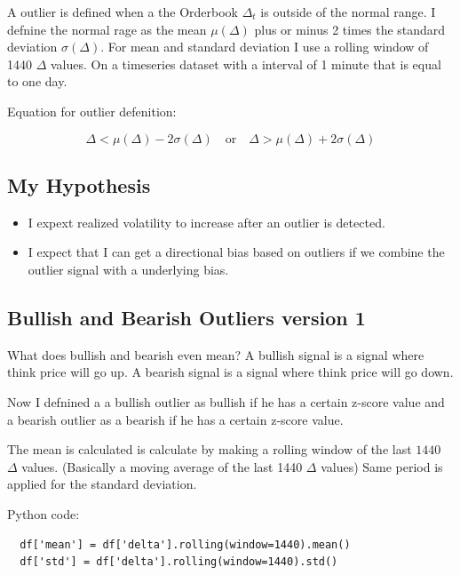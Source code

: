 \documentclass[12pt]{article}
\begin{document}
A outlier is defined when a the Orderbook $\Delta_t$ is outside of the normal range. I defnine the normal rage as the mean $\mu(\Delta)$ plus or minus 2 times the standard deviation $\sigma(\Delta)$. For mean and standard deviation I use a rolling window of 1440 $\Delta$ values. On a timeseries dataset with a interval of 1 minute that is equal to one day.

Equation for outlier defenition:



\begin{equation}\label{eq: outlier_detection}
  \Delta < \mu(\Delta) - 2\sigma(\Delta) \quad \text{or} \quad \Delta > \mu(\Delta) + 2\sigma(\Delta)    
\end{equation}


 \subsection{My Hypothesis}

\begin{itemize}
  \item I expext realized volatility to increase after an outlier is detected.
  \item I expect that I can get a directional bias based on outliers if we combine the outlier signal with a underlying bias.
\end{itemize}



\subsection{Bullish and Bearish Outliers version 1}
What does bullish and bearish even mean? A bullish signal is a signal where think price will go up. A bearish signal is a signal where think price will go down.

Now I defnined a a bullish outlier as bullish if he has a certain z-score value and a bearish outlier as a bearish if he has a certain z-score value.

The mean is calculated is calculate by making a rolling window of the last $1440$ $\Delta$ values. (Basically a moving average of the last 1440 $\Delta$ values)
Same period is applied for the standard deviation.

Python code:
\begin{verbatim}
  df['mean'] = df['delta'].rolling(window=1440).mean()
  df['std'] = df['delta'].rolling(window=1440).std()
\end{verbatim}
\end{document}

